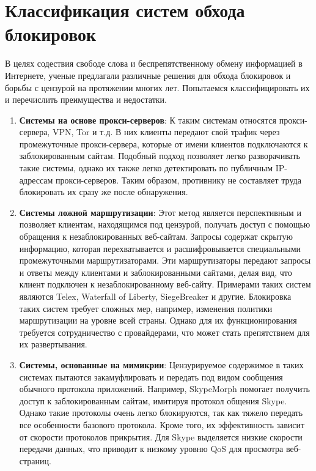 \section{Классификация систем обхода блокировок}
В целях содествия свободе слова и беспрепятственному обмену информацией в Интернете,
ученые предлагали различные решения для обхода блокировок и борьбы с цензурой на протяжении многих лет.
Попытаемся классифицировать их и перечислить преимущества и недостатки.

\begin{enumerate}

    \item \textbf{Системы на основе прокси-серверов}: К таким системам относятся прокси-сервера, VPN, Tor и т.д.
    В них клиенты передают свой трафик через промежуточные прокси-сервера, которые от имени клиентов подключаются к заблокированным сайтам.
    Подобный подход позволяет легко разворачивать такие системы, однако их также легко детектировать по публичным IP-адрессам прокси-серверов.
    Таким образом, противнику не составляет труда блокировать их сразу же после обнаружения.

    \item \textbf{Системы ложной маршрутизации}:
    Этот метод является перспективным и позволяет клиентам, находящимся под цензурой, получать доступ с помощью обращения к незаблокированных веб-сайтам.
    Запросы содержат скрытую информацию, которая перехватывается и расшифровывается специальными промежуточными маршрутизаторами.
    Эти маршрутизаторы передают запросы и ответы между клиентами и заблокированными сайтами, делая вид, что клиент подключен к незаблокированному веб-сайту.
    Примерами таких систем являются Telex, Waterfall of Liberty, SiegeBreaker и другие.
    Блокировка таких систем требует сложных мер, например, изменения политики маршрутизации на уровне всей страны.
    Однако для их функционирования требуется сотрудничество с провайдерами, что может стать препятствием для их развертывания.

    \item \textbf{Системы, основанные на мимикрии}:
    Цензурируемое содержимое в таких системах пытаются закамуфлировать и передать под видом сообщения обычного протокола приложений.
    Например, SkypeMorph помогает получить доступ к заблокированным сайтам, имитируя протокол общения Skype.
    Однако такие протоколы очень легко блокируются, так как тяжело передать все особенности базового протокола.
    Кроме того, их эффективность зависит от скорости протоколов прикрытия. Для Skype выделяется низкие скорости передачи данных,
    что приводит к низкому уровню QoS для просмотра веб-страниц.


\end{enumerate}
